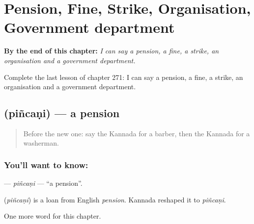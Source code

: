 
\chapter{Pension, Fine, Strike, Organisation, Government department}
\label{ch:ka-pension-fine-strike-organisation-government-department}

\begin{chapteropening}
\textbf{By the end of this chapter:} \emph{I can say a pension, a fine, a strike, an organisation and a government department.}

Complete the last lesson of chapter 271: I can say a pension, a fine, a strike, an organisation and a government department.
\end{chapteropening}

\section[\texorpdfstring{\kn{ಪಿಂಚಣಿ} (piñcaṇi)}{ಪಿಂಚಣಿ (piñcaṇi)}]{ (piñcaṇi) — a pension}

\label{lesson:KA-C271-pincani}



\begin{quote}
Before the new one: say the Kannada for a barber, then the Kannada for a washerman.
\end{quote}

\subsection*{You'll want to know: }
\textbf{} — \emph{piñcaṇi} — \textquotedblleft{}a pension\textquotedblright{}.

\begin{cousinweb}
\textbf{} (\emph{piñcaṇi}) is a loan from English \emph{pension}. Kannada reshaped it to \emph{piñcaṇi}.
\end{cousinweb}

\begin{grammarlens}[title={What you've built}]
One more word for this chapter.
\end{grammarlens}

